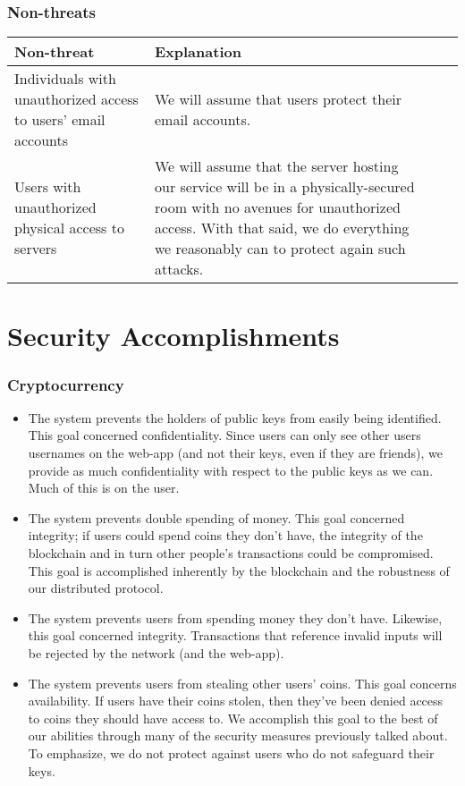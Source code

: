 \documentclass[12pt]{article}
\begin{document}
\subsubsection*{Non-threats}

\begin{tabulary}{\linewidth}{|L|L|L|L|}
\hline
\textbf{Non-threat} & \textbf{Explanation} \\
\hline
Individuals with unauthorized access to users' email accounts & We will assume that users protect their email accounts.
\\ \hline
Users with unauthorized physical access to servers & We will assume that the server hosting our service will be in a physically-secured room with no avenues for unauthorized access. With that said, we do everything we reasonably can to protect again such attacks.
\\ \hline
\end{tabulary}


\section{Security Accomplishments}

\subsubsection*{Cryptocurrency}
\begin{itemize}
\item The system prevents the holders of public keys from easily being identified. This goal concerned confidentiality. Since users can only see other users usernames on the web-app (and not their keys, even if they are friends), we provide as much confidentiality with respect to the public keys as we can. Much of this is on the user.
\item The system prevents double spending of money. This goal concerned integrity; if users could spend coins they don't have, the integrity of the blockchain and in turn other people's transactions could be compromised. This goal is accomplished inherently by the blockchain and the robustness of our distributed protocol.
\item The system prevents users from spending money they don't have. Likewise, this goal concerned integrity. Transactions that reference invalid inputs will be rejected by the network (and the web-app).
\item The system prevents users from stealing other users' coins. This goal concerns availability. If users have their coins stolen, then they've been denied access to coins they should have access to. We accomplish this goal to the best of our abilities through many of the security measures previously talked about. To emphasize, we do not protect against users who do not safeguard their keys.
\end{itemize}
\end{document}
